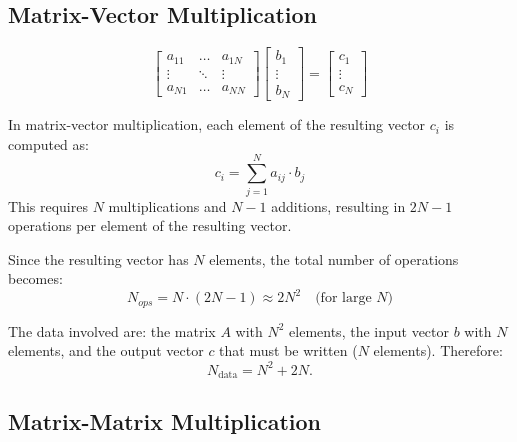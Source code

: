 \subsection{Matrix-Vector Multiplication}

\begin{equation}
	\begin{bmatrix}
		a_{11} & \hdots & a_{1N} \\ 
		\vdots & \ddots & \vdots \\ 
		a_{N1} & \hdots & a_{NN}
	\end{bmatrix}
	\begin{bmatrix}
		b_{1}  \\ 
		\vdots \\ 
		b_{N}
	\end{bmatrix}
	=
	\begin{bmatrix}
		c_{1}  \\ 
		\vdots \\ 
		c_{N}
	\end{bmatrix}
\end{equation}

\vspace{0.25cm}

In matrix-vector multiplication, each element of the resulting vector \(c_i\) is computed as:
\begin{equation}
c_i = \sum_{j=1}^{N} a_{ij} \cdot b_j
\end{equation}
This requires \(N\) multiplications and \(N-1\) additions, resulting in \(2N-1\) operations per element of the resulting vector.

Since the resulting vector has \(N\) elements, the total number of operations becomes:
\begin{equation}
N_{ops} = N \cdot (2N-1) \approx 2N^2 \quad \text{(for large \(N\))}
\end{equation}

The data involved are: the matrix \(A\) with \(N^2\) elements, the input vector \(b\) with \(N\) elements, and the output vector \(c\) that must be written (\(N\) elements). Therefore:
\begin{equation}
N_{\text{data}} = N^2 + 2N.
\end{equation}

\subsection{Matrix-Matrix Multiplication}

